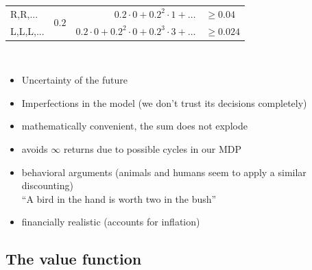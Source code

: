 \begin{frame}
{\begin{table}[h]
{\begin{tabular}{lcrl}
\multicolumn{1}{|l|}{R,R,...}   & \multicolumn{1}{c|}{\multirow{2}{*}{$0.2$}}         & $0.2 \cdot 0 + 0.2^2 \cdot 1 + \ldots$                                     & \multicolumn{1}{l|}{$\ge \mathbf{0.04}$}                  \\   \cline{1-1} \cline{3-4}
\multicolumn{1}{|l|}{L,L,L,...} & \multicolumn{1}{l|}{}              & $0.2 \cdot 0 + 0.2^2 \cdot 0 + 0.2^3 \cdot 3 +\ldots$              & \multicolumn{1}{l|}{$\ge {0.024}$}                \\ \hline
\end{tabular}%
}

\end{table}
}



\end{frame}

\begin{frame}

\\

\pause

\begin{itemize}
\item Uncertainty of the future
\item Imperfections in the model (we don't trust its decisions completely)
\item mathematically convenient, the sum does not explode
\item avoids $\infty$ returns due to possible cycles in our MDP
\item behavioral arguments (animals and humans seem to apply a similar discounting)\\
``A bird in the hand is worth two in the bush''
\item financially realistic (accounts for inflation)
\end{itemize}

\end{frame} 

\newpage

\subsection{The value function}



